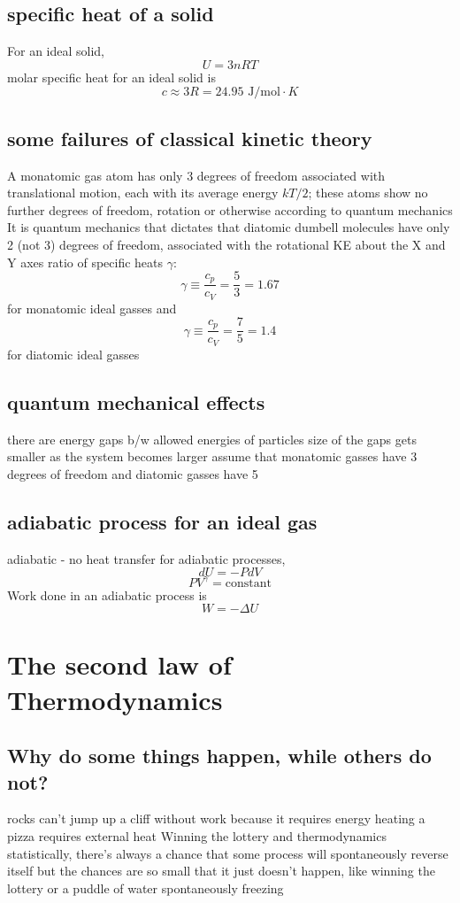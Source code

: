 \documentclass{article}
\begin{document}
\subsection{specific heat of a solid}
\begin{outline}
\1 For an ideal solid, \[U=3nRT\]
\1 molar specific heat for an ideal solid is \[c\approx3R=24.95\text{ J/mol}\cdot K\]
\end{outline}
\subsection{some failures of classical kinetic theory}
\begin{outline}
\1 A monatomic gas atom has only 3 degrees of freedom associated with translational motion, each with its average energy $kT/2$; these atoms show no further degrees of freedom, rotation or otherwise according to quantum mechanics
\1 It is quantum mechanics that dictates that diatomic dumbell molecules have only 2 (not 3) degrees of freedom, associated with the rotational KE about the X and Y axes
\1 ratio of specific heats $\gamma$: \[\gamma\equiv\dfrac{c_p}{c_V}=\dfrac{5}{3}=1.67\] for monatomic ideal gasses and \[\gamma\equiv\dfrac{c_p}{c_V}=\dfrac{7}{5}=1.4\] for diatomic ideal gasses
\end{outline}
\subsection{quantum mechanical effects}
\begin{outline}
\1 there are energy gaps b/w allowed energies of particles
\1 size of the gaps gets smaller as the system becomes larger
\1 assume that monatomic gasses have 3 degrees of freedom and diatomic gasses have 5
\end{outline}
\subsection{adiabatic process for an ideal gas}
\begin{outline}
\1 adiabatic - no heat transfer
\1 for adiabatic processes, \[dU=-PdV\]
\0 \[PV^\gamma=\text{constant}\]
\1 Work done in an adiabatic process is \[W=-\Delta U\]
\end{outline}
\section{The second law of Thermodynamics}
\subsection{Why do some things happen, while others do not?}
\begin{outline}
\1 rocks can't jump up a cliff without work because it requires energy
\1 heating a pizza requires external heat
\1 Winning the lottery and thermodynamics
\2 statistically, there's always a chance that some process will spontaneously reverse itself but the chances are so small that it just doesn't happen, like winning the lottery or a puddle of water spontaneously freezing
\end{outline}
\end{document}
